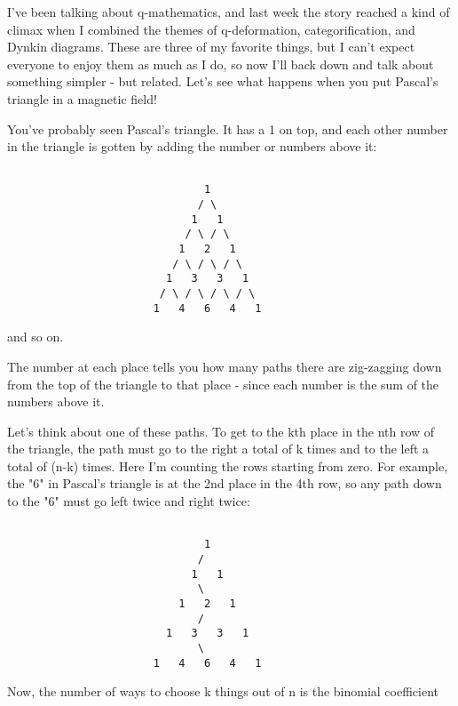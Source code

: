 



I've been talking about q-mathematics, and last week the story reached 
a kind of climax when I combined the themes of q-deformation,
categorification, and Dynkin diagrams.  These are three of my favorite
things, but I can't expect everyone to enjoy them as much as I do, so
now I'll back down and talk about something simpler - but related. 
Let's see what happens when you put Pascal's triangle in a magnetic field!

You've probably seen Pascal's triangle.  It has a 1 on top, and
each other number in the triangle is gotten by adding the number 
or numbers above it:


\begin{verbatim}

                               1
                              / \
                             1   1
                            / \ / \
                           1   2   1
                          / \ / \ / \
                         1   3   3   1
                        / \ / \ / \ / \
                       1   4   6   4   1
\end{verbatim}
    
and so on.  

The number at each place tells you how many paths there are zig-zagging
down from the top of the triangle to that place - since each number is
the sum of the numbers above it.  

Let's think about one of these paths.  To get to the kth place in the
nth row of the triangle, the path must go to the right a total of k
times and to the left a total of (n-k) times.  Here I'm counting the
rows starting from zero.  For example, the "6" in Pascal's triangle is
at the 2nd place in the 4th row, so any path down to the "6" must go
left twice and right twice:


\begin{verbatim}

                               1
                              / 
                             1   1
                              \ 
                           1   2   1
                              /   
                         1   3   3   1
                              \   
                       1   4   6   4   1
\end{verbatim}
    
Now, the number of ways to choose k things out of n is the binomial
coefficient


